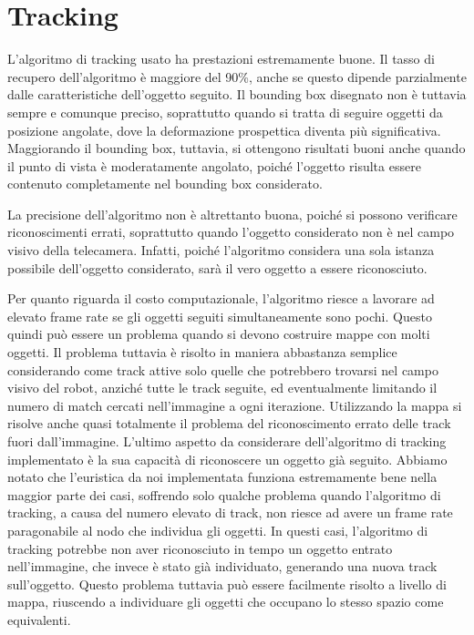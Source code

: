 \section{Tracking}
L'algoritmo di tracking usato ha prestazioni estremamente buone. Il tasso di recupero dell'algoritmo è maggiore del 90\%, anche se questo dipende parzialmente dalle caratteristiche dell'oggetto seguito. Il bounding box disegnato non è tuttavia sempre e comunque preciso, soprattutto quando si tratta di seguire oggetti da posizione angolate, dove la deformazione prospettica diventa più significativa. Maggiorando il bounding box, tuttavia, si ottengono risultati buoni anche quando il punto di vista è moderatamente angolato, poiché l'oggetto risulta essere contenuto completamente nel bounding box considerato.

La precisione dell'algoritmo non è altrettanto buona, poiché si possono verificare riconoscimenti errati, soprattutto quando l'oggetto considerato non è nel campo visivo della telecamera. Infatti, poiché l'algoritmo considera una sola istanza possibile dell'oggetto considerato, sarà il vero oggetto a essere riconosciuto.

Per quanto riguarda il costo computazionale, l'algoritmo riesce a lavorare ad elevato frame rate se gli oggetti seguiti simultaneamente sono pochi. Questo quindi può essere un problema quando si devono costruire mappe con molti oggetti. Il problema tuttavia è risolto in maniera abbastanza semplice considerando come track attive solo quelle che potrebbero trovarsi nel campo visivo del robot, anziché tutte le track seguite, ed eventualmente limitando il numero di match cercati nell'immagine a ogni iterazione. Utilizzando la mappa si risolve anche quasi totalmente il problema del riconoscimento errato delle track fuori dall'immagine.
L'ultimo aspetto da considerare dell'algoritmo di tracking implementato è la sua capacità di riconoscere un oggetto già seguito.
Abbiamo notato che l'euristica da noi implementata funziona estremamente bene nella maggior parte dei casi, soffrendo solo qualche problema quando l'algoritmo di tracking, a causa del numero elevato di track, non riesce ad avere un frame rate paragonabile al nodo che individua gli oggetti. In questi casi, l'algoritmo di tracking potrebbe non aver riconosciuto in tempo un oggetto entrato nell'immagine, che invece è stato già individuato, generando una nuova track sull'oggetto. Questo problema tuttavia può essere facilmente risolto a livello di mappa, riuscendo a individuare gli oggetti che occupano lo stesso spazio come equivalenti.

